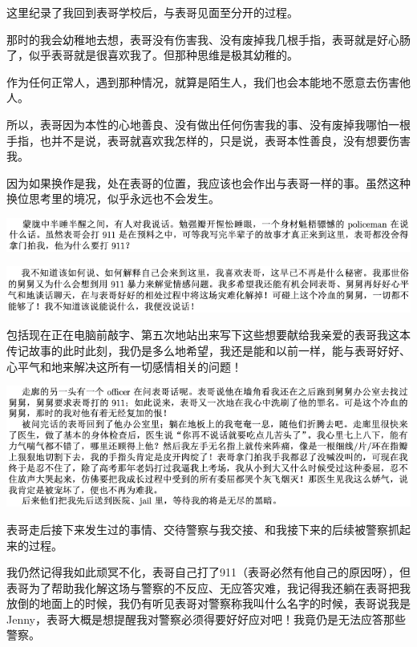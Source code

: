 \documentclass[9pt, b5paper]{article}
\begin{document}
这里纪录了我回到表哥学校后，与表哥见面至分开的过程。

那时的我会幼稚地去想，表哥没有伤害我、没有废掉我几根手指，表哥就是好心肠了，似乎表哥就是很喜欢我了。但那种思维是极其幼稚的。

作为任何正常人，遇到那种情况，就算是陌生人，我们也会本能地不愿意去伤害他人。

所以，表哥因为本性的心地善良、没有做出任何伤害我的事、没有废掉我哪怕一根手指，也并不是说，表哥就喜欢我怎样的，只是说，表哥本性善良，没有想要伤害我。

因为如果换作是我，处在表哥的位置，我应该也会作出与表哥一样的事。虽然这种换位思考里的境况，似乎永远也不会发生。

\begin{center}
\includegraphics[width=.9\linewidth]{./pic/p1p131-1.png}
\end{center}

\begin{center}
\includegraphics[width=.9\linewidth]{./pic/p1p131-2.png}
\end{center}

包括现在正在电脑前敲字、第五次地站出来写下这些想要献给我亲爱的表哥我这本传记故事的此时此刻，我仍是多么地希望，我还是能和以前一样，能与表哥好好、心平气和地来解决这所有一切感情相关的问题！

\begin{center}
\includegraphics[width=.9\linewidth]{./pic/p1p131-3.png}
\end{center}

表哥走后接下来发生过的事情、交待警察与我交接、和我接下来的后续被警察抓起来的过程。 

我仍然记得我如此顽冥不化，表哥自己打了911（表哥必然有他自己的原因呀），但表哥为了帮助我化解这场与警察的不反应、无应答灾难，我记得我还躺在表哥把我放倒的地面上的时候，我仍有听见表哥对警察称我叫什么名字的时候，表哥说我是Jenny，表哥大概是想提醒我对警察必须得要好好应对吧！我竟仍是无法应答那些警察。
\end{document}
